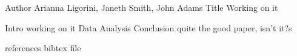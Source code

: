 
Author Arianna Ligorini, Janeth Smith, John Adams 
Title Working on it


Intro working on it
Data
Analysis
Conclusion quite the good paper, isn't it?s


references
bibtex file
